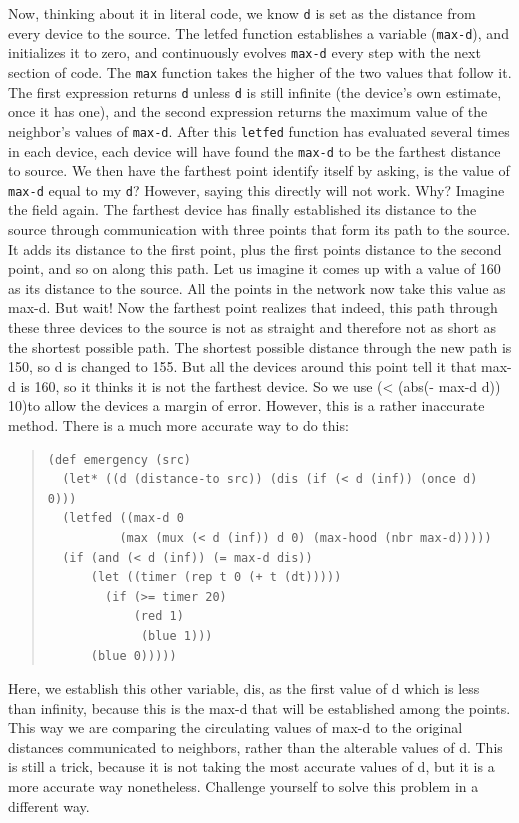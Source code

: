 \documentclass{article}
\newcommand\var[1]{{\tt #1}}
\begin{document}
Now, thinking about it in literal code, we know \var{d} is set as the
distance from every device to the source.  The letfed function
establishes a variable (\var{max-d}), and initializes it to zero, and
continuously evolves \var{max-d} every step with the next section of
code.  The \var{max} function takes the higher of the two values that
follow it.  The first expression returns \var{d} unless \var{d} is
still infinite (the device's own estimate, once it has one), and the
second expression returns the maximum value of the neighbor's values
of \var{max-d}.  After this \var{letfed} function has evaluated
several times in each device, each device will have found the \var{max-d} to
be the farthest distance to source.  We then have the farthest point
identify itself by asking, is the value of \var{max-d} equal to my \var{d}?
However, saying this directly will not work.  Why?  Imagine the field
again. The farthest device has finally established its distance to the
source through communication with three points that form its path to
the source. It adds its distance to the first point, plus the first
points distance to the second point, and so on along this path. Let us 
imagine it comes up with a value of 160 as its distance to the source. All the
points in the network now take this value as max-d. But wait! Now the
farthest point realizes that indeed, this path through these three
devices to the source is not as straight and therefore not as short as
the shortest possible path. The shortest possible distance through the
new path is 150, so d is changed to 155. But all the devices around
this point tell it that max-d is 160, so it thinks it is not the
farthest device. So we use (< (abs(- max-d d)) 10)to allow the devices
a margin of error. However, this is a rather inaccurate method. There
is a much more accurate way to do this:

\begin{quote}
\begin{verbatim}
(def emergency (src) 
  (let* ((d (distance-to src)) (dis (if (< d (inf)) (once d) 0))) 
  (letfed ((max-d 0 
	      (max (mux (< d (inf)) d 0) (max-hood (nbr max-d))))) 
  (if (and (< d (inf)) (= max-d dis)) 
      (let ((timer (rep t 0 (+ t (dt))))) 			 
		(if (>= timer 20) 
		    (red 1) 
	         (blue 1))) 
      (blue 0)))))
\end{verbatim}
\end{quote}

Here, we establish this other variable, dis, as the first value of d
which is less than infinity, because this is the max-d that will be
established among the points. This way we are comparing the
circulating values of max-d to the original distances communicated to
neighbors, rather than the alterable values of d. This is still a
trick, because it is not taking the most accurate values of d, but it
is a more accurate way nonetheless. Challenge yourself to solve this
problem in a different way.
\end{document}
